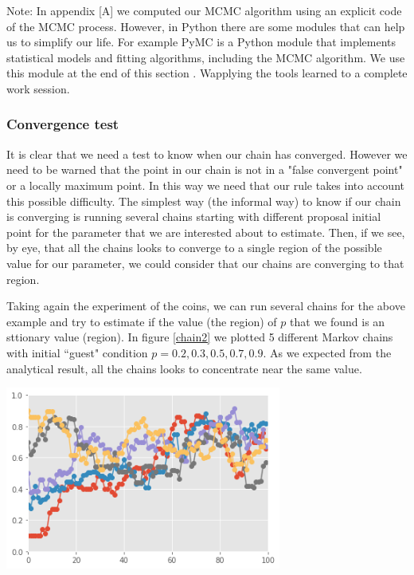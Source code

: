 \documentclass[onecolumn,           %
               showpacs,            %
               preprintnumbers,     %
               aps,                 %
               prl,          	    %
               letterpaper,             %
               superscriptaddress,      %
               nofootinbib,         %
               tightenlines,        %
               floats,floatfix      %
               ,usenatbib,
               ]{revtex4-1}
\begin{document}
Note: In appendix [A] we computed our MCMC algorithm using an explicit code of the MCMC process. However, in Python there are some modules that can help us to simplify our life. For example PyMC is a Python module that implements statistical models and fitting algorithms, including the MCMC algorithm. We use this module at the end of this section . Wapplying the tools learned to a complete work session.

\subsubsection{Convergence test} 
It is clear that we need a test to know when our chain has converged. However we need to be warned that the point in our chain is not in a "false convergent point" or a locally maximum point. In this way we need that our rule takes into account this possible difficulty. The simplest way (the informal way) to know if our chain is converging is running several chains starting with different proposal initial point for the parameter that we are interested about to estimate. Then, if we see, by eye, that all the chains looks to converge to a single region of the possible value for our parameter, we could consider that our chains are converging to that region. 

 Taking again the experiment of the coins, we can run several chains for the above example and try to estimate if the value (the region) of $p$ that we found is an sttionary value (region). In figure \ref{chain2} we plotted 5 different Markov chains with initial ``guest" condition $p=0.2,0.3,0.5,0.7,0.9$. As we expected from the analytical result, all the chains looks to concentrate near the same value.

\begin{minipage}{\textwidth}
\centering
\includegraphics[height=6cm]{Figures/chain22.png}
\label{chain2}
\end{minipage}
\end{document}
